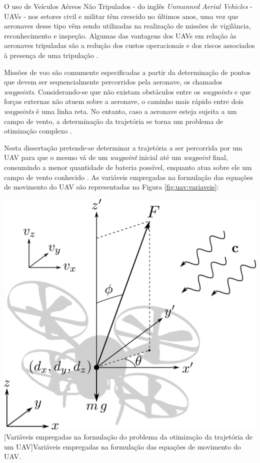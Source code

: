 
O uso de Veículos Aéreos Não Tripulados - do inglês \textit{Unmanned Aerial Vehicles} - UAVs - nos setores civil e militar têm crescido no últimos anos, uma vez que aeronaves desse tipo vêm sendo utilizadas na realização de missões de vigilância, reconhecimento e inspeção. Algumas das vantagens dos UAVs em relação às aeronaves tripuladas são a redução dos custos operacionais e dos riscos associados à presença de uma tripulação \cite{toledo_de_azevedo_pseudospectral_2018}. 

Missões de voo são comumente especificadas a partir da determinação de pontos que devem ser sequencialmente percorridos pela aeronave, os chamados \textit{waypoints}. Considerando-se que não existam obstáculos entre os \textit{waypoints} e que forças externas não atuem sobre a aeronave, o caminho mais rápido entre dois \textit{waypoints} é uma linha reta. No entanto, caso a aeronave esteja sujeita a um campo de vento, a determinação da trajetória se torna um problema de otimização complexo \cite{toledo_de_azevedo_pseudospectral_2018}. 

Nesta dissertação pretende-se determinar a trajetória a ser percorrida por um UAV para que o mesmo vá de um \textit{waypoint} inicial até um \textit{waypoint} final, consumindo a menor quantidade de bateria possível, enquanto atua sobre ele um campo de vento conhecido \cite{toledo_de_azevedo_pseudospectral_2018}. As variáveis empregadas na formulação das equações de movimento do UAV são representadas na Figura \ref{fig:uav:variaveis}:

\noindent	
\begin{minipage}{\textwidth}
	\vspace{\onelineskip}
	\centering
	\includegraphics[scale=0.25]{draw/resultados/pdf/uav}
	[Variáveis empregadas na formulação do problema  da otimização da trajetória de um UAV]{Variáveis empregadas na formulação das equações de movimento do UAV.}
	\label{fig:uav:variaveis}
	\vspace{\onelineskip}
\end{minipage}
%

